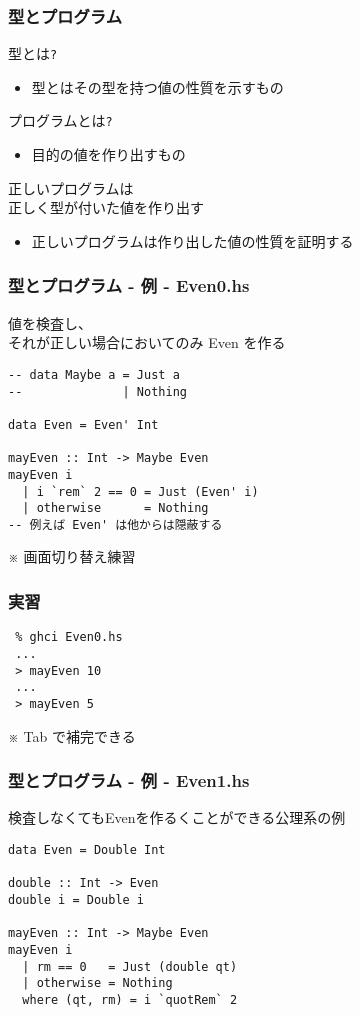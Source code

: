 \documentclass[cjk,dvipdfm,14pt]{beamer}
\begin{document}
\begin{frame}[fragile]
\frametitle{型とプログラム}

型とは\verb|?|
\begin{itemize}
\item 型とはその型を持つ値の性質を示すもの
\end{itemize}

プログラムとは\verb|?|
\begin{itemize}
\item 目的の値を作り出すもの
\end{itemize}

正しいプログラムは\\正しく型が付いた値を作り出す
\begin{itemize}
\item { \color{red} 正しいプログラムは作り出した値の性質を証明する }
\end{itemize}

\end{frame}

\begin{frame}[fragile]
\frametitle{型とプログラム - 例 - Even0.hs}

値を検査し、\\
それが正しい場合においてのみ Even を作る
\begin{lstlisting}
-- data Maybe a = Just a
--              | Nothing

data Even = Even' Int

mayEven :: Int -> Maybe Even
mayEven i
  | i `rem` 2 == 0 = Just (Even' i)
  | otherwise      = Nothing
-- 例えば Even' は他からは隠蔽する
\end{lstlisting}

\end{frame}

\begin{frame}[fragile]
※ 画面切り替え練習
\end{frame}

\begin{frame}[fragile]
\frametitle{実習}

\begin{lstlisting}
 % ghci Even0.hs
 ...
 > mayEven 10
 ...
 > mayEven 5
\end{lstlisting}
※ Tab で補完できる

\end{frame}

\begin{frame}[fragile]
\frametitle{型とプログラム - 例 - Even1.hs}

検査しなくてもEvenを作るくことができる公理系の例
\begin{lstlisting}
data Even = Double Int

double :: Int -> Even
double i = Double i

mayEven :: Int -> Maybe Even
mayEven i
  | rm == 0   = Just (double qt)
  | otherwise = Nothing
  where (qt, rm) = i `quotRem` 2
\end{lstlisting}

\end{frame}
\end{document}
